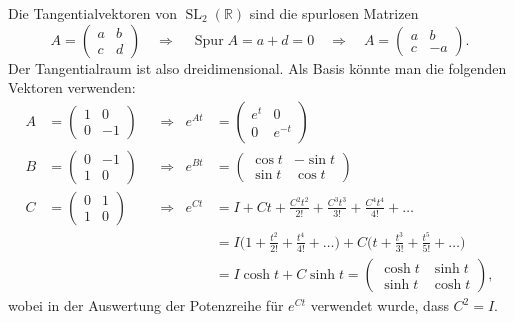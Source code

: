 \begin{beispiel}
Die Tangentialvektoren von $\operatorname{SL}_2(\mathbb{R})$ sind 
die spurlosen Matrizen
\[
A=\begin{pmatrix}a&b\\c&d\end{pmatrix}
\quad\Rightarrow\quad
\operatorname{Spur}A=a+d=0
\quad\Rightarrow\quad
A=\begin{pmatrix}a&b\\c&-a\end{pmatrix}.
\]
Der Tangentialraum ist also dreidimensional.
Als Basis könnte man die folgenden Vektoren verwenden:
\begin{align*}
A
&=
\begin{pmatrix}1&0\\0&-1\end{pmatrix}
&&\Rightarrow&
e^{At}
&=
\begin{pmatrix} e^t & 0 \\ 0 & e^{-t} \end{pmatrix}
\\
B
&=
\begin{pmatrix}0&-1\\1&0\end{pmatrix}
&&\Rightarrow&
e^{Bt}
&=
\begin{pmatrix}
\cos t & -\sin t\\
\sin t &  \cos t
\end{pmatrix}
\\
C
&=
\begin{pmatrix}0&1\\1&0\end{pmatrix}
&&\Rightarrow&
e^{Ct}
&=
I + Ct + \frac{C^2t^2}{2!} + \frac{C^3t^3}{3!} + \frac{C^4t^4}{4!}+\dots
\\
&&&&
&=
I\biggl(1 + \frac{t^2}{2!} + \frac{t^4}{4!}+\dots \biggr)
+
C\biggl(t + \frac{t^3}{3!} + \frac{t^5}{5!}+\dots \biggr)
\\
&&&&
&=
I\cosh t + C \sinh t
=
\begin{pmatrix}
\cosh t & \sinh t\\
\sinh t & \cosh t
\end{pmatrix},
\end{align*}
wobei in der Auswertung der Potenzreihe für $e^{Ct}$ verwendet wurde,
dass $C^2=I$.


\end{beispiel}
